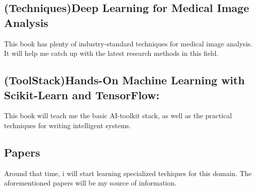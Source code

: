 	\subsection{(Techniques)Deep Learning for Medical Image Analysis}
	This book has plenty of industry-standard techniques for medical image analysis. It will help me catch up with the latest research methods in this field.
	\subsection{(ToolStack)Hands-On Machine Learning with Scikit-Learn and TensorFlow: }
	This book will teach me the basic AI-toolkit stack, as well as the practical techniques for writing intelligent systems.
	\subsection{Papers}
	Around that time, i will start learning specialized techiques for this domain. The aforementioned papers will be my source of information.	
